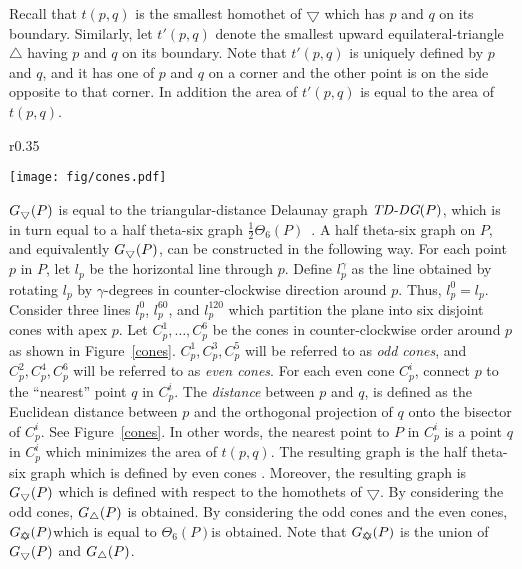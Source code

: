 \documentclass[11pt,a4paper]{article}
\newcommand{\cone}[2]{C^{#1}_{#2}}
\newcommand{\G}[2]{G_{#1}({#2})}
\newcommand{\trid}{\bigtriangledown}
\newcommand{\trids}{\scriptsize\bigtriangledown}
\newcommand{\triu}{\bigtriangleup}
\newcommand{\trius}{\scriptsize\bigtriangleup}
\newcommand{\GUD}{G_{\bigtriangledown \hspace*{-7.5pt} \bigtriangleup}}
\begin{document}
Recall that $t(p,q)$ is the smallest homothet of $\trid$ which has $p$ and $q$ on its boundary. Similarly, let $t'(p, q)$ denote the smallest upward equilateral-triangle $\triu$ having $p$ and $q$ on its boundary. Note that $t'(p, q)$ is uniquely defined by $p$ and $q$, and it has one of $p$ and $q$ on a corner and the other point is on the side opposite to that corner. In addition the area of $t'(p, q)$ is equal to the area of $t(p, q)$. 

\begin{wrapfigure}{r}{0.35\textwidth}
\vspace{-20pt}
 \begin{center}
\texttt{[image: fig/cones.pdf]}
  \end{center}
\vspace{-5pt}
  \caption{The construction of $\G{\trid}{P}$.}
\label{cones}
\vspace{-5pt}
\end{wrapfigure}

$\G{\trids}{P}$ is equal to the triangular-distance Delaunay graph $\text{\em TD-DG}(P)$, which is in turn equal to a half theta-six graph $\frac{1}{2}\Theta_6(P)$~\cite{Bonichon2010}. 
A half theta-six graph on $P$, and equivalently $\G{\trids}{P}$, can be constructed in the following way. For each point $p$ in $P$, let $l_p$ be the horizontal line through $p$. Define $l_p^{\gamma}$ as the line obtained by rotating $l_p$ by $\gamma$-degrees in counter-clockwise direction around $p$. Thus, $l_p^0=l_p$. Consider three lines $l_p^{0}$, $l_p^{60}$, and $l_p^{120}$ which partition the plane into six disjoint cones with apex $p$. Let $C_p^1, \dots, C_p^6$ be the cones in counter-clockwise order around $p$ as shown in Figure~\ref{cones}. $C_p^1,C_p^3,C_p^5$ will be referred to as {\em odd cones}, and $C_p^2,C_p^4,C_p^6$ will be referred to as {\em even cones}. For each even cone $C_p^i$, connect $p$ to the ``nearest'' point $q$ in $C_p^i$. The {\em distance} between $p$ and $q$, is defined as the Euclidean distance between $p$ and the orthogonal projection of $q$ onto the bisector of $C_p^i$. See Figure~\ref{cones}. In other words, the nearest point to $P$ in $\cone{i}{p}$ is a point $q$ in $\cone{i}{p}$ which minimizes the area of $t(p,q)$. The resulting graph is the half theta-six graph which is defined by even cones \cite{Bonichon2010}. Moreover, the resulting graph is $\G{\trids}{P}$ which is defined with respect to the homothets of $\trid$. By considering the odd cones, $\G{\trius}{P}$ is obtained. By considering the odd cones and the even cones, $\GUD(P)$\textemdash which is equal to $\Theta_6(P)$\textemdash is obtained. Note that $\GUD(P)$ is the union of $\G{\trids}{P}$ and $\G{\trius}{P}$. 
\end{document}
